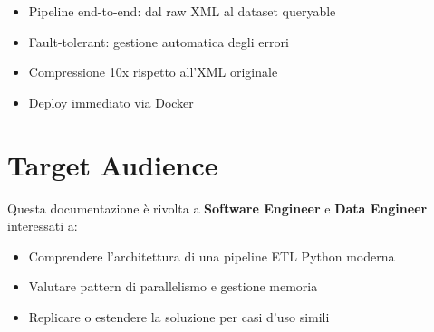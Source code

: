 \begin{infobox}
\begin{itemize}
    \item Pipeline end-to-end: dal raw XML al dataset queryable
    \item Fault-tolerant: gestione automatica degli errori
    \item Compressione 10x rispetto all'XML originale
    \item Deploy immediato via Docker
\end{itemize}
\end{infobox}

\section{Target Audience}

Questa documentazione è rivolta a \textbf{Software Engineer} e \textbf{Data Engineer} interessati a:

\begin{itemize}
    \item Comprendere l'architettura di una pipeline ETL Python moderna
    \item Valutare pattern di parallelismo e gestione memoria
    \item Replicare o estendere la soluzione per casi d'uso simili
\end{itemize}

